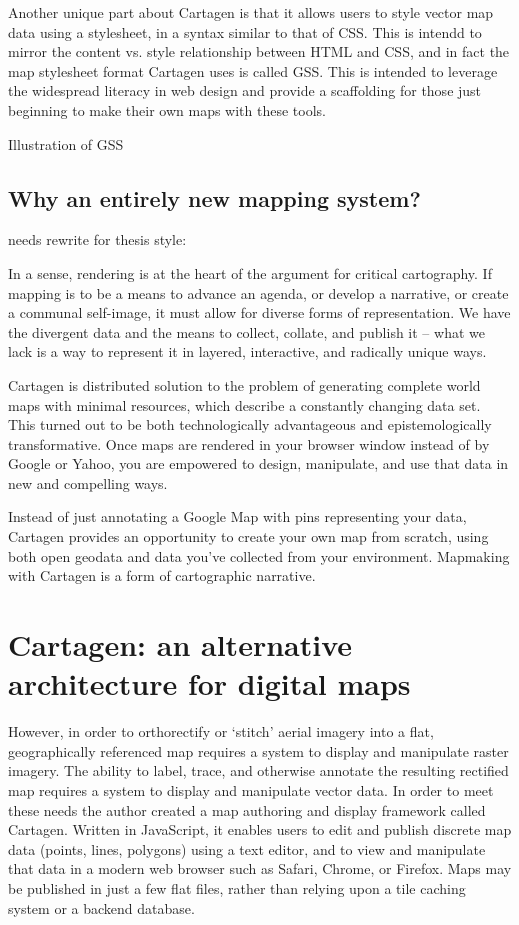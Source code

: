 \documentclass[11pt]{report}
\begin{document}
Another unique part about Cartagen is that it allows users to style vector map data using a stylesheet, in a syntax similar to that of CSS. This is intendd to mirror the content vs. style relationship between HTML and CSS, and in fact the map stylesheet format Cartagen uses is called GSS. This is intended to leverage the widespread literacy in web design and provide a scaffolding for those just beginning to make their own maps with these tools. 

Illustration of GSS

\subsection{Why an entirely new mapping system?}

needs rewrite for thesis style:

In a sense, rendering is at the heart of the argument for critical cartography. If mapping is to be a means to advance an agenda, or develop a narrative, or create a communal self-image, it must allow for diverse forms of representation. We have the divergent data and the means to collect, collate, and publish it – what we lack is a way to represent it in layered, interactive, and radically unique ways. 

Cartagen is distributed solution to the problem of generating complete world maps with minimal resources, which describe a constantly changing data set. This turned out to be both technologically advantageous and epistemologically transformative. Once maps are rendered in your browser window instead of by Google or Yahoo, you are empowered to design, manipulate, and use that data in new and compelling ways. 

Instead of just annotating a Google Map with pins representing your data, Cartagen provides an opportunity to create your own map from scratch, using both open geodata and data you've collected from your environment. Mapmaking with Cartagen is a form of cartographic narrative. 

\section{Cartagen: an alternative architecture for digital maps}

However, in order to orthorectify or `stitch' aerial imagery into a flat, geographically referenced map requires a system to display and manipulate raster imagery. The ability to label, trace, and otherwise annotate the resulting rectified map requires a system to display and manipulate vector data. In order to meet these needs the author created a map authoring and display framework called Cartagen. Written in JavaScript, it enables users to edit and publish discrete map data (points, lines, polygons) using a text editor, and to view and manipulate that data in a modern web browser such as Safari, Chrome, or Firefox. Maps may be published in just a few flat files, rather than relying upon a tile caching system or a backend database.
\end{document}
